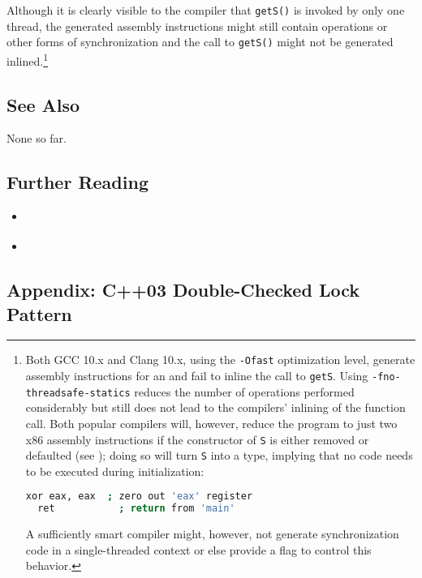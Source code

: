 \noindent Although it is clearly visible to the compiler that \lstinline!getS()! is
invoked by only one thread, the generated assembly instructions might
still contain  operations or other forms of
synchronization and the call to \lstinline!getS()! might not be generated
inlined.{\cprotect\footnote{Both GCC 10.x and Clang 10.x, using the
\lstinline!-Ofast! optimization level, generate assembly instructions for
an  and fail to inline the call
to \lstinline!getS!. Using \lstinline!-fno-threadsafe-statics! reduces the
number of operations performed considerably but still does not lead to
the compilers' inlining of the function call. Both popular compilers
will, however, reduce the program to just two x86 assembly
instructions if the  constructor of \lstinline!S!
  is either removed or defaulted (see );
  doing so will turn \lstinline!S! into a 
  type, implying that no code needs to be executed during
  initialization:

  \begin{lstlisting}[language=bash,style=footcodeplain]
  xor eax, eax  ; zero out 'eax' register
  ret           ; return from 'main'
  \end{lstlisting}

\noindent A sufficiently smart compiler might, however, not generate
  synchronization code in a single-threaded context or else provide a
  flag to control this behavior.
  }}

\subsection[See Also]{See Also}\label{see-also}

None so far.

\subsection[Further Reading]{Further Reading}\label{further-reading}

\begin{itemize}
\item{\cite{meyers04}}
\item{\cite{stroustrup20}}
\end{itemize}

\subsection[Appendix: C++03 Double-Checked Lock Pattern]{Appendix: C++03 Double-Checked Lock Pattern}\label{appendix:-c++03-double-checked-lock-pattern}

